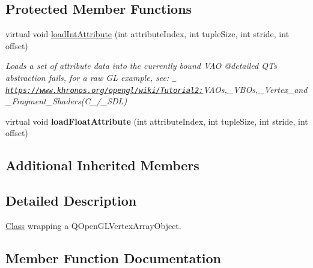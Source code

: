 \subsection*{Protected Member Functions}
\begin{DoxyCompactItemize}
\item 
\mbox{\label{classrev_1_1_g_l_1_1_vertex_array_object_a0e59dfc145abe26c021a21135e293221}} 
virtual void \mbox{\hyperlink{classrev_1_1_g_l_1_1_vertex_array_object_a0e59dfc145abe26c021a21135e293221}{load\+Int\+Attribute}} (int attribute\+Index, int tuple\+Size, int stride, int offset)
\begin{DoxyCompactList}\small\item\em Loads a set of attribute data into the currently bound V\+AO @detailed QT\textquotesingle{}s abstraction fails, for a raw GL example, see\+: \href{https://www.khronos.org/opengl/wiki/Tutorial2:}{\texttt{ https\+://www.\+khronos.\+org/opengl/wiki/\+Tutorial2\+:}}{\itshape V\+A\+Os,\+\_\+\+V\+B\+Os,\+\_\+\+Vertex\+\_\+and\+\_\+\+Fragment\+\_\+\+Shaders}(C\+\_\+/\+\_\+\+S\+DL) \end{DoxyCompactList}\item 
\mbox{\label{classrev_1_1_g_l_1_1_vertex_array_object_a0396637e00841b84531dc073fd8b6352}} 
virtual void {\bfseries load\+Float\+Attribute} (int attribute\+Index, int tuple\+Size, int stride, int offset)
\end{DoxyCompactItemize}
\subsection*{Additional Inherited Members}


\subsection{Detailed Description}
\mbox{\hyperlink{struct_class}{Class}} wrapping a Q\+Open\+G\+L\+Vertex\+Array\+Object. 

\subsection{Member Function Documentation}
\mbox{\label{classrev_1_1_g_l_1_1_vertex_array_object_aa8d8fd5f855f66d7f4727ff71f84ffa6}} 
